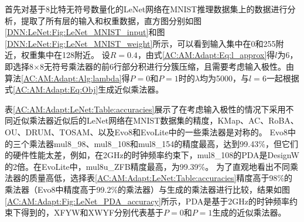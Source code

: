 \begin{table}[ht]
    \renewcommand{\arraystretch}{1.3}
    \setlength\tabcolsep{3.76pt}
    \caption{采用不同近似乘法器近似后的LeNet网络在MNIST数据集的精度}
    \label{AC:AM:Adapt:LeNet:Table:accuracies}
    \centering
\end{table}

首先对基于8比特无符号数量化的LeNet网络在MNIST推理数据集\cite{DNN:LeNet_MNIST}上的数据进行分析，提取了所有层的输入和权重数据，直方图分别如图\ref{DNN:LeNet:Fig:LeNet_MNIST_input}和图\ref{DNN:LeNet:Fig:LeNet_MNIST_weight}所示，可以看到输入集中在0和255附近，权重集中在128附近。
设$R=0.4$，由式\eqref{AC:AM:Adapt:Eq:l_approx}得$l$为6，即选择8$\times$8无符号乘法器的前6行部分积进行分簇压缩，且需要考虑输入极性。由算法\ref{AC:AM:Adapt:Alg:lambda}得$P=0$和$P=1$时的$\lambda$均为5000，与$l=6$一起根据式\eqref{AC:AM:Adapt:Eq:Obj}生成近似乘法器。

表\ref{AC:AM:Adapt:LeNet:Table:accuracies}展示了在考虑输入极性的情况下采用不同近似乘法器近似后的LeNet网络在MNIST数据集的精度，KMap、AC、RoBA、OU、DRUM、TOSAM、以及Evo8和EvoLite中的一些乘法器是对称的。
Evo8中的三个乘法器mul8\_98、mul8\_108和mul8\_154的精度最高，达到99.43\%，但它们的硬件性能太差，例如，在2GHz的时钟频率约束下，mul8\_108的PDA是DesignW的2倍。在EvoLite中，mul8u\_ZFB精度最高，为99.39\%。
为了直观地看出不同乘法器的质量高低，选择表\ref{AC:AM:Adapt:LeNet:Table:accuracies}精度高于98\%的乘法器（Evo8中精度高于99.2\%的乘法器）与生成的乘法器进行比较，结果如图\ref{AC:AM:Adapt:Fig:LeNet_PDA_accuracy}所示，PDA是基于2GHz的时钟频率约束下得到的，XFYW和XWYF分别代表基于$P=0$和$P=1$生成的近似乘法器。

